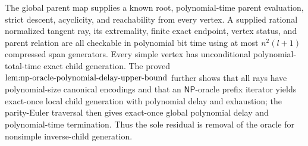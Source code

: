 The global parent map supplies a known root, polynomial-time parent evaluation, strict descent, acyclicity, and reachability from every vertex. A supplied rational normalized tangent ray, its extremality, finite exact endpoint, vertex status, and parent relation are all checkable in polynomial bit time using at most \(n^2(l+1)\) compressed span generators. Every simple vertex has unconditional polynomial-total-time exact child generation. The proved \(\textup{lem:np-oracle-polynomial-delay-upper-bound}\) further shows that all rays have polynomial-size canonical encodings and that an \(\mathsf{NP}\)-oracle prefix iterator yields exact-once local child generation with polynomial delay and exhaustion; the parity-Euler traversal then gives exact-once global polynomial delay and polynomial-time termination. Thus the sole residual is removal of the oracle for nonsimple inverse-child generation.